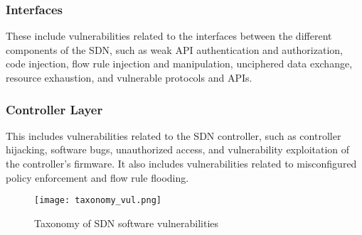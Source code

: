 \subsubsection*{Interfaces} 
These include vulnerabilities related to the interfaces between the different components of the SDN, such as weak API authentication and authorization, code injection, flow rule injection and manipulation, unciphered data exchange, resource exhaustion, and vulnerable protocols and APIs.

\subsubsection*{Controller Layer}
This includes vulnerabilities related to the SDN controller, such as controller hijacking, software bugs, unauthorized access, and vulnerability exploitation of the controller's firmware. It also includes vulnerabilities related to misconfigured policy enforcement and flow rule flooding.\\


\begin{adjustbox}{width=\linewidth}
\end{adjustbox}

\begin{figure}[ht!]
\centering
\texttt{[image: taxonomy\_vul.png]}
\caption{Taxonomy of SDN software vulnerabilities}
\label{fig_txn_vul}
\end{figure}


